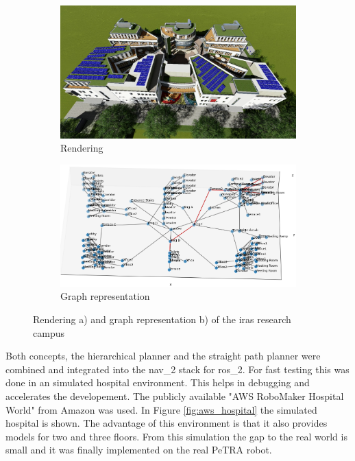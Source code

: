 \begin{figure}[h]
    \captionsetup[subfigure]{justification=centering}
    \centering
    \begin{subfigure}{.5\textwidth}
      \centering
      \includegraphics[width=\textwidth]{figures/30_methods/ltc_rendering.png}
      \caption{Rendering}
    \end{subfigure}%
    \begin{subfigure}{.5\textwidth}
      \centering
      \includegraphics[width=\textwidth]{figures/30_methods/ltc_graph.png}
      \caption{Graph representation}
    \end{subfigure}
    \caption[Rendering and graph representation of the \gls{iras} research campus]{Rendering a) and graph representation b) of the \gls{iras} research campus}
    \label{fig:ltc_rendering}
\end{figure}

Both concepts, the hierarchical planner and the straight path planner were combined and integrated into the \gls{nav_2} stack for \gls{ros_2}. For fast testing this was done in an simulated hospital environment. This helps in debugging and accelerates the developement. The publicly available "AWS RoboMaker Hospital World" from Amazon \cite{aws_robotics_aws_2023} was used. In Figure \ref{fig:aws_hospital} the simulated hospital is shown. The advantage of this environment is that it also provides models for two and three floors. From this simulation the gap to the real world is small and it was finally implemented on the real PeTRA robot.

